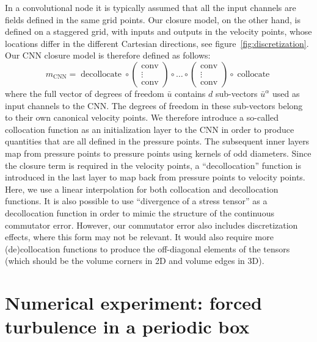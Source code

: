 \documentclass[preprint]{elsarticle}
\newcommand{\revone}[1]{#1}
\begin{document}
In a convolutional node it is typically assumed that all the input channels are
fields defined in the same grid points. Our closure model, on the other hand,
is defined on a staggered grid, with inputs and outputs in the velocity points,
whose locations differ in the different Cartesian directions, see
figure~\ref{fig:discretization}. Our CNN closure model is therefore defined as
follows:
\begin{equation}
        m_\text{CNN} = \operatorname{decollocate}
        \circ
        \begin{pmatrix} 
            \operatorname{conv} \\
            \vdots \\
            \operatorname{conv}
        \end{pmatrix}
        \circ \dots \circ
        \begin{pmatrix} 
            \operatorname{conv} \\
            \vdots \\
            \operatorname{conv}
        \end{pmatrix}
        \circ
        \operatorname{collocate}
\end{equation}
where the full vector of degrees of freedom $\bar{u}$ contains $d$
sub-vectors $\bar{u}^\alpha$ used as input channels to the CNN.
The degrees of freedom in these sub-vectors belong to their own canonical
velocity points. We therefore introduce a so-called collocation function as an
initialization layer to the CNN in order to produce quantities that are all
defined in the pressure points. The subsequent inner layers map from pressure
points to pressure points using kernels of odd diameters. Since the closure term
is required in the velocity points, a ``decollocation'' function is introduced in
the last layer to map back from pressure points to velocity points. Here, we use
a linear interpolation for both collocation and decollocation functions. It is
also possible to use ``divergence of a stress tensor'' as a decollocation
function in order to mimic the structure of the continuous commutator error.
However, our commutator error also includes discretization effects, where this
form may not be relevant. It would also require more (de)collocation functions
to produce the off-diagonal elements of the tensors (which should be the volume
corners in 2D and volume edges in 3D).

\section{Numerical experiment: \revone{forced} turbulence in a periodic box} \label{sec:results}
\end{document}
